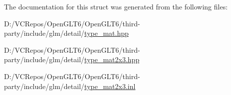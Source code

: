 The documentation for this struct was generated from the following files\+:\begin{DoxyCompactItemize}
\item 
D\+:/\+V\+C\+Repos/\+Open\+G\+L\+T6/\+Open\+G\+L\+T6/third-\/party/include/glm/detail/\mbox{\hyperlink{type__mat_8hpp}{type\+\_\+mat.\+hpp}}\item 
D\+:/\+V\+C\+Repos/\+Open\+G\+L\+T6/\+Open\+G\+L\+T6/third-\/party/include/glm/detail/\mbox{\hyperlink{type__mat2x3_8hpp}{type\+\_\+mat2x3.\+hpp}}\item 
D\+:/\+V\+C\+Repos/\+Open\+G\+L\+T6/\+Open\+G\+L\+T6/third-\/party/include/glm/detail/\mbox{\hyperlink{type__mat2x3_8inl}{type\+\_\+mat2x3.\+inl}}\end{DoxyCompactItemize}
